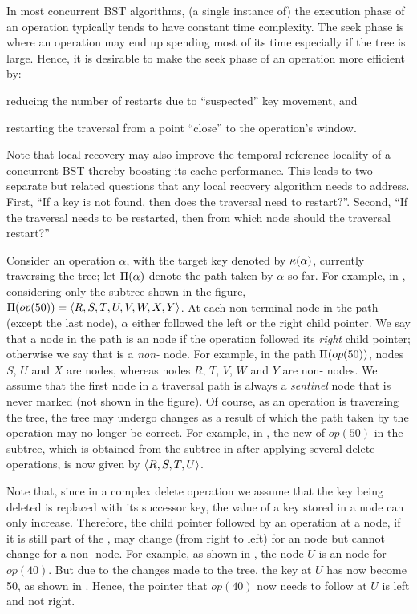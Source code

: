 In most concurrent BST algorithms, (a single instance of) the execution phase of an operation typically tends to have constant time complexity. The seek phase is where an operation may end up spending most of its time especially if the tree is large. Hence, it is desirable to make the seek phase of an operation more efficient by:
\begin{enumerate*}[label=(\roman*)]
\item reducing the number of restarts due to ``suspected'' key movement, and
\item restarting the traversal from a point ``close'' to the operation's window.
\end{enumerate*}
Note that local recovery may also improve the temporal reference locality of a concurrent BST thereby boosting its cache performance.
This leads to two separate but related questions that any local recovery algorithm needs to address. First, ``If a key is not found, then does the traversal need to restart?''. Second, ``If the traversal needs to be restarted, then from which node should the traversal restart?''

Consider an operation $\alpha$, with the target key denoted by $\kappa(\alpha)$, currently traversing the tree; let $\Pi(\alpha)$ denote the path taken by $\alpha$ so far. For example, in , considering only the subtree shown in the figure, $\Pi(op(50)) = \langle R, S, T, U, V, W, X, Y \rangle$. At each non-terminal node in the path (except the last node), $\alpha$ either followed 
the left or the right child pointer. We say that a node in the path is an \emph{\myanchor} node if the operation followed its \emph{right} child pointer; otherwise we say that is a 
\emph{non-\myanchor{}} node. For example, in the path $\Pi(op(50))$, nodes $S$, $U$ and $X$ are \myanchor{} nodes, whereas nodes $R$, $T$, $V$, $W$ and $Y$ 
are non-\myanchor{} nodes. We assume that the first \myanchor{} node in a traversal path is always a \emph{sentinel} node that is never marked (not shown in the figure). Of course, as an operation is traversing the tree, the tree may undergo changes as a result of which the path taken by the operation may no longer be correct. For example, in , the new \accesspath of $op(50)$ in the subtree, which is obtained from the subtree in  after applying several delete operations, is now given 
by $\langle R, S, T, U \rangle$. 

Note that, since in a complex delete operation we assume that the key being deleted is replaced with its successor key, the value of a key stored in a node can only increase. Therefore, the child pointer followed by an operation at a node, if it is still part of the \accesspath, may change (from right to left) for an \myanchor{} node but cannot change for a non-\myanchor{} node. For example, as shown in , the node $U$ is an \myanchor{} node for $op(40)$. But due to the changes made to the tree, the key at $U$ has now become 50, as shown in . Hence, the pointer that $op(40)$ now needs to follow at $U$ is left and not right. 

